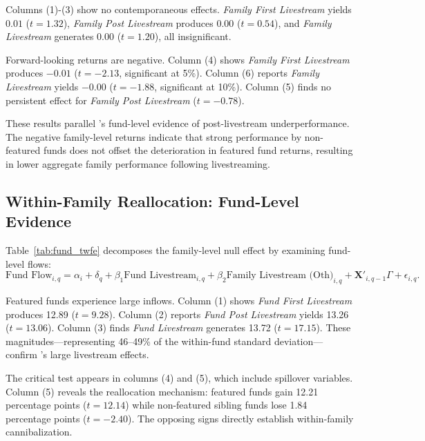 \documentclass[12pt]{article}
\begin{document}
Columns (1)-(3) show no contemporaneous effects. \textit{Family First Livestream} yields $0.01$ ($t = 1.32$), \textit{Family Post Livestream} produces $0.00$ ($t = 0.54$), and \textit{Family Livestream} generates $0.00$ ($t = 1.20$), all insignificant. %

Forward-looking returns are negative. Column (4) shows \textit{Family First Livestream} produces $-0.01$ ($t = -2.13$, significant at 5\%). Column (6) reports \textit{Family Livestream} yields $-0.00$ ($t = -1.88$, significant at 10\%). Column (5) finds no persistent effect for \textit{Family Post Livestream} ($t = -0.78$).

These results parallel \citet{dehaan2025social}'s fund-level evidence of post-livestream underperformance. The negative family-level returns indicate that strong performance by non-featured funds does not offset the deterioration in featured fund returns, resulting in lower aggregate family performance following livestreaming.

\subsection{Within-Family Reallocation: Fund-Level Evidence}\label{subsec:fund_reallocation}

Table~\ref{tab:fund_twfe} decomposes the family-level null effect by examining fund-level flows:
\begin{equation}
    \label{eq:fund_flow}
    \text{Fund Flow}_{i,q} = \alpha_i + \delta_q + \beta_1 \text{Fund Livestream}_{i,q} + \beta_2 \text{Family Livestream (Oth)}_{i,q} + \mathbf{X}'_{i,q-1} \Gamma + \epsilon_{i,q}.
\end{equation}

Featured funds experience large inflows. Column (1) shows \textit{Fund First Livestream} produces 12.89 ($t = 9.28$). Column (2) reports \textit{Fund Post Livestream} yields 13.26 ($t = 13.06$). Column (3) finds \textit{Fund Livestream} generates 13.72 ($t = 17.15$). These magnitudes—representing 46--49\% of the within-fund standard deviation—confirm \citet{dehaan2025social}'s large livestream effects.

The critical test appears in columns (4) and (5), which include spillover variables. Column (5) reveals the reallocation mechanism: featured funds gain 12.21 percentage points ($t = 12.14$) while non-featured sibling funds lose 1.84 percentage points ($t = -2.40$). The opposing signs directly establish within-family cannibalization.
\end{document}
